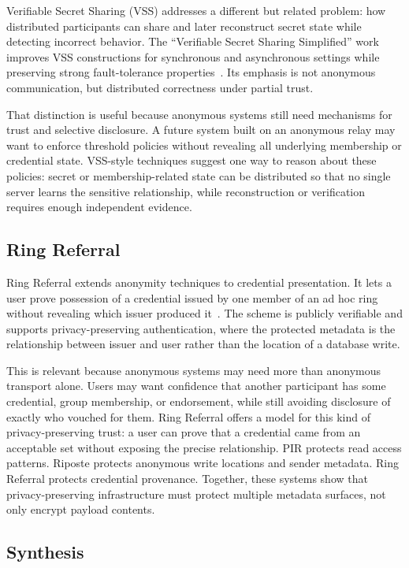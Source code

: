\documentclass[conference]{IEEEtran}
\begin{document}
Verifiable Secret Sharing (VSS) addresses a different but related problem: how distributed participants can share and later reconstruct secret state while detecting incorrect behavior. The ``Verifiable Secret Sharing Simplified'' work improves VSS constructions for synchronous and asynchronous settings while preserving strong fault-tolerance properties~\cite{vsssimplified}. Its emphasis is not anonymous communication, but distributed correctness under partial trust.

That distinction is useful because anonymous systems still need mechanisms for trust and selective disclosure. A future system built on an anonymous relay may want to enforce threshold policies without revealing all underlying membership or credential state. VSS-style techniques suggest one way to reason about these policies: secret or membership-related state can be distributed so that no single server learns the sensitive relationship, while reconstruction or verification requires enough independent evidence.

\subsection{Ring Referral}

Ring Referral extends anonymity techniques to credential presentation. It lets a user prove possession of a credential issued by one member of an ad hoc ring without revealing which issuer produced it~\cite{ringreferral}. The scheme is publicly verifiable and supports privacy-preserving authentication, where the protected metadata is the relationship between issuer and user rather than the location of a database write.

This is relevant because anonymous systems may need more than anonymous transport alone. Users may want confidence that another participant has some credential, group membership, or endorsement, while still avoiding disclosure of exactly who vouched for them. Ring Referral offers a model for this kind of privacy-preserving trust: a user can prove that a credential came from an acceptable set without exposing the precise relationship. PIR protects read access patterns. Riposte protects anonymous write locations and sender metadata. Ring Referral protects credential provenance. Together, these systems show that privacy-preserving infrastructure must protect multiple metadata surfaces, not only encrypt payload contents.

\subsection{Synthesis}
\end{document}

